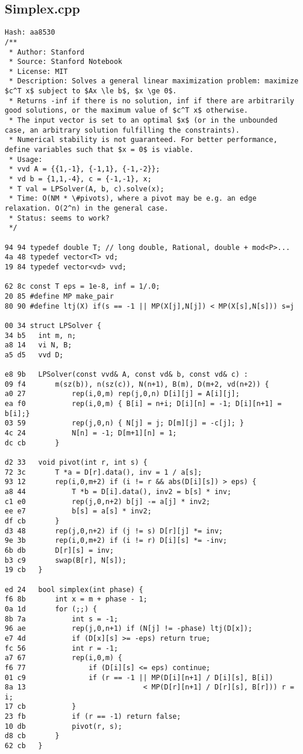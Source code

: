 \documentclass[11pt, a4paper, twoside]{article}
\begin{document}
\subsection{Simplex.cpp}
\begin{lstlisting}
Hash: aa8530
/**
 * Author: Stanford
 * Source: Stanford Notebook
 * License: MIT
 * Description: Solves a general linear maximization problem: maximize $c^T x$ subject to $Ax \le b$, $x \ge 0$.
 * Returns -inf if there is no solution, inf if there are arbitrarily good solutions, or the maximum value of $c^T x$ otherwise.
 * The input vector is set to an optimal $x$ (or in the unbounded case, an arbitrary solution fulfilling the constraints).
 * Numerical stability is not guaranteed. For better performance, define variables such that $x = 0$ is viable.
 * Usage:
 * vvd A = {{1,-1}, {-1,1}, {-1,-2}};
 * vd b = {1,1,-4}, c = {-1,-1}, x;
 * T val = LPSolver(A, b, c).solve(x);
 * Time: O(NM * \#pivots), where a pivot may be e.g. an edge relaxation. O(2^n) in the general case.
 * Status: seems to work?
 */

94 94 typedef double T; // long double, Rational, double + mod<P>...
4a 48 typedef vector<T> vd;
19 84 typedef vector<vd> vvd;

62 8c const T eps = 1e-8, inf = 1/.0;
20 85 #define MP make_pair
80 90 #define ltj(X) if(s == -1 || MP(X[j],N[j]) < MP(X[s],N[s])) s=j

00 34 struct LPSolver {
34 b5 	int m, n;
a8 14 	vi N, B;
a5 d5 	vvd D;
      
e8 9b 	LPSolver(const vvd& A, const vd& b, const vd& c) :
09 f4 		m(sz(b)), n(sz(c)), N(n+1), B(m), D(m+2, vd(n+2)) {
a0 27 			rep(i,0,m) rep(j,0,n) D[i][j] = A[i][j];
ea f0 			rep(i,0,m) { B[i] = n+i; D[i][n] = -1; D[i][n+1] = b[i];}
03 59 			rep(j,0,n) { N[j] = j; D[m][j] = -c[j]; }
4c 24 			N[n] = -1; D[m+1][n] = 1;
dc cb 		}
      
d2 33 	void pivot(int r, int s) {
72 3c 		T *a = D[r].data(), inv = 1 / a[s];
93 12 		rep(i,0,m+2) if (i != r && abs(D[i][s]) > eps) {
a8 44 			T *b = D[i].data(), inv2 = b[s] * inv;
c1 e0 			rep(j,0,n+2) b[j] -= a[j] * inv2;
ee e7 			b[s] = a[s] * inv2;
df cb 		}
d3 48 		rep(j,0,n+2) if (j != s) D[r][j] *= inv;
9e 3b 		rep(i,0,m+2) if (i != r) D[i][s] *= -inv;
6b db 		D[r][s] = inv;
b3 c9 		swap(B[r], N[s]);
19 cb 	}
      
ed 24 	bool simplex(int phase) {
f6 8b 		int x = m + phase - 1;
0a 1d 		for (;;) {
8b 7a 			int s = -1;
96 ae 			rep(j,0,n+1) if (N[j] != -phase) ltj(D[x]);
e7 4d 			if (D[x][s] >= -eps) return true;
fc 56 			int r = -1;
a7 67 			rep(i,0,m) {
f6 77 				if (D[i][s] <= eps) continue;
01 c9 				if (r == -1 || MP(D[i][n+1] / D[i][s], B[i])
8a 13 				             < MP(D[r][n+1] / D[r][s], B[r])) r = i;
17 cb 			}
23 fb 			if (r == -1) return false;
10 db 			pivot(r, s);
d8 cb 		}
62 cb 	}
      

\end{lstlisting}
\end{document}
